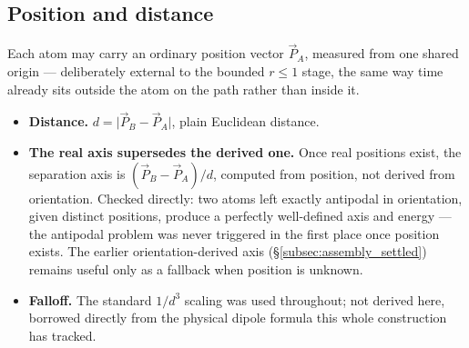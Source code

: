 \documentclass[12pt, a4paper]{article}
\begin{document}
\subsection{Position and distance}
\label{subsec:assembly_position}
Each atom may carry an ordinary position vector $\vec P_A$, measured
from one shared origin --- deliberately external to the bounded
$r\le 1$ stage, the same way time already sits outside the atom on
the path rather than inside it.
\begin{itemize}
\item \textbf{Distance.} $d=\lvert \vec P_B-\vec P_A\rvert$, plain
      Euclidean distance.
\item \textbf{The real axis supersedes the derived one.} Once real
      positions exist, the separation axis is
      $(\vec P_B-\vec P_A)/d$, computed from position, not derived
      from orientation. Checked directly: two atoms left exactly
      antipodal in orientation, given distinct positions, produce a
      perfectly well-defined axis and energy --- the antipodal
      problem was never triggered in the first place once position
      exists. The earlier orientation-derived axis
      (\S\ref{subsec:assembly_settled}) remains useful only as a
      fallback when position is unknown.
\item \textbf{Falloff.} The standard $1/d^3$ scaling was used
      throughout; not derived here, borrowed directly from the
      physical dipole formula this whole construction has tracked.
\end{itemize}
\end{document}
